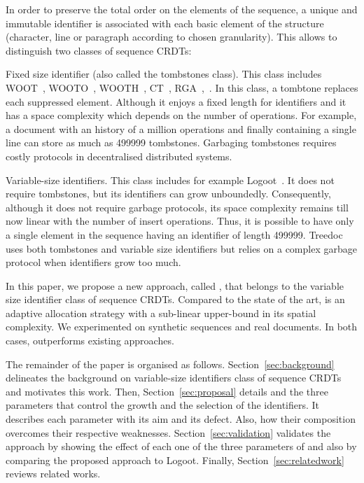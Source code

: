 In order to preserve the total order on the elements of the sequence, a unique
and immutable identifier is associated with each basic element of the structure
(character, line or paragraph according to chosen granularity). This allows to
distinguish two classes of sequence CRDTs:
\begin{inparaenum}[(i)]
\item Fixed size identifier (also called the tombstones class). This class
  includes WOOT~\cite{oster2006data}, WOOTO~\cite{weiss2007wooki},
  WOOTH~\cite{ahmed2011evaluating}, CT~\cite{grishchenko2010deep},
  RGA~\cite{roh2011replicated},~\cite{Yu2012stringwise}. In this class, a
  tombtone replaces each suppressed element. Although it enjoys a fixed length
  for identifiers and it has a space complexity which depends on the number of
  operations. For example, a document with an history of a million operations
  and finally containing a single line can store as much as 499999
  tombstones. Garbaging tombstones requires costly protocols in decentralised
  distributed systems.
\item Variable-size identifiers. This class includes for example
  Logoot~\cite{weiss2009logoot}. It does not require tombstones, but its
  identifiers can grow unboundedly. Consequently, although it does not require
  garbage protocols, its space complexity remains till now linear with the
  number of insert operations. Thus, it is possible to have only a single
  element in the sequence having an identifier of length
  499999. Treedoc~\cite{preguica2009commutative} uses both tombstones and
  variable size identifiers but relies on a complex garbage protocol when
  identifiers grow too much.
\end{inparaenum}

In this paper, we propose a new approach, called \NAME{}, that belongs to the
variable size identifier class of sequence CRDTs. Compared to the state of the
art, \NAME{} is an adaptive allocation strategy with a sub-linear upper-bound
in its spatial complexity. We experimented \NAME{} on synthetic sequences and
real documents. In both cases, \NAME{} outperforms existing approaches.

The remainder of the paper is organised as
follows. Section~\ref{sec:background} delineates the background on
variable-size identifiers class of sequence CRDTs and motivates this
work. Then, Section~\ref{sec:proposal} details \NAME{} and the three parameters
that control the growth and the selection of the identifiers. It describes each
parameter with its aim and its defect. Also, how their composition overcomes
their respective weaknesses. Section~\ref{sec:validation} validates the
approach by showing the effect of each one of the three parameters of \NAME{}
and also by comparing the proposed approach to Logoot. Finally,
Section~\ref{sec:relatedwork} reviews related works.
